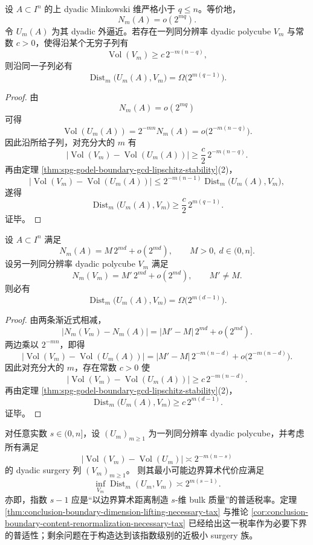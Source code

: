 \begin{theorem}[维数抬升的必要边界税率]\label{thm:conclusion-boundary-dimension-lifting-necessary-tax}
设 \(A\subset I^n\) 的上 dyadic Minkowski 维严格小于 \(q\le n\)。等价地，
\[
N_m(A)=o(2^{mq}).
\]
令 \(U_m(A)\) 为其 dyadic 外逼近。若存在一列同分辨率 dyadic polycube \(V_m\) 与常数 \(c>0\)，使得沿某个无穷子列有
\[
\operatorname{Vol}(V_m)\ge c\,2^{-m(n-q)},
\]
则沿同一子列必有
\[
\operatorname{Dist}_m\bigl(U_m(A),V_m\bigr)=\Omega\!\bigl(2^{m(q-1)}\bigr).
\]
\end{theorem}
\begin{proof}
由
\[
N_m(A)=o(2^{mq})
\]
可得
\[
\operatorname{Vol}(U_m(A))
=
2^{-mn}N_m(A)
=
o\!\bigl(2^{-m(n-q)}\bigr).
\]
因此沿所给子列，对充分大的 \(m\) 有
\[
\bigl|\operatorname{Vol}(V_m)-\operatorname{Vol}(U_m(A))\bigr|
\ge
\frac{c}{2}\,2^{-m(n-q)}.
\]
再由定理 \ref{thm:spg-godel-boundary-gcd-lipschitz-stability}(2)，
\[
\bigl|\operatorname{Vol}(V_m)-\operatorname{Vol}(U_m(A))\bigr|
\le
2^{-m(n-1)}\operatorname{Dist}_m\bigl(U_m(A),V_m\bigr),
\]
遂得
\[
\operatorname{Dist}_m\bigl(U_m(A),V_m\bigr)
\ge
\frac{c}{2}\,2^{m(q-1)}.
\]
证毕。
\end{proof}

\begin{corollary}[固定维数下内容重整的必要边界税率]\label{cor:conclusion-boundary-content-renormalization-necessary-tax}
设 \(A\subset I^n\) 满足
\[
N_m(A)=M\,2^{md}+o(2^{md}),
\qquad
M>0,\ d\in(0,n].
\]
设另一列同分辨率 dyadic polycube \(V_m\) 满足
\[
N_m(V_m)=M'\,2^{md}+o(2^{md}),
\qquad
M'\neq M.
\]
则必有
\[
\operatorname{Dist}_m\bigl(U_m(A),V_m\bigr)=\Omega\!\bigl(2^{m(d-1)}\bigr).
\]
\end{corollary}
\begin{proof}
由两条渐近式相减，
\[
|N_m(V_m)-N_m(A)|
=
|M'-M|\,2^{md}+o(2^{md}).
\]
两边乘以 \(2^{-mn}\)，即得
\[
\bigl|\operatorname{Vol}(V_m)-\operatorname{Vol}(U_m(A))\bigr|
=
|M'-M|\,2^{-m(n-d)}+o\!\bigl(2^{-m(n-d)}\bigr).
\]
因此对充分大的 \(m\)，存在常数 \(c>0\) 使
\[
\bigl|\operatorname{Vol}(V_m)-\operatorname{Vol}(U_m(A))\bigr|
\ge
c\,2^{-m(n-d)}.
\]
再由定理 \ref{thm:spg-godel-boundary-gcd-lipschitz-stability}(2)，
\[
\operatorname{Dist}_m\bigl(U_m(A),V_m\bigr)
\ge
c\,2^{m(d-1)}.
\]
证毕。
\end{proof}

\begin{conjecture}\label{conj:conclusion-boundary-real-dimension-surgery-tax-equivalence}
对任意实数 \(s\in(0,n]\)，设 \((U_m)_{m\ge 1}\) 为一列同分辨率 dyadic polycube，并考虑所有满足
\[
\bigl|\operatorname{Vol}(V_m)-\operatorname{Vol}(U_m)\bigr|
\asymp
2^{-m(n-s)}
\]
的 dyadic surgery 列 \((V_m)_{m\ge 1}\)。
则其最小可能边界算术代价应满足
\[
\inf_{V_m}\operatorname{Dist}_m(U_m,V_m)\asymp 2^{m(s-1)}.
\]
亦即，指数 \(s-1\) 应是“以边界算术距离制造 \(s\)-维 bulk 质量”的普适税率。定理 \ref{thm:conclusion-boundary-dimension-lifting-necessary-tax} 与推论 \ref{cor:conclusion-boundary-content-renormalization-necessary-tax} 已经给出这一税率作为必要下界的普适性；剩余问题在于构造达到该指数级别的近极小 surgery 族。
\end{conjecture}
